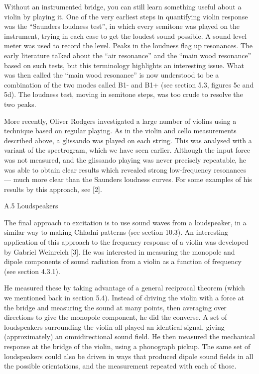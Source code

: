   Without an instrumented bridge, you can still learn something useful about a 
  violin by playing it. One of the very earliest steps in quantifying violin 
  response was the “Saunders loudness test”, in which every semitone was played 
  on the instrument, trying in each case to get the loudest sound possible. A 
  sound level meter was used to record the level. Peaks in the loudness flag up 
  resonances. The early literature talked about the “air resonance” and the 
  “main wood resonance” based on such tests, but this terminology highlights an 
  interesting issue. What was then called the “main wood resonance” is now 
  understood to be a combination of the two modes called B1- and B1+ (see 
  section 5.3, figures 5c and 5d). The loudness test, moving in semitone steps, 
  was too crude to resolve the two peaks. 

  More recently, Oliver Rodgers investigated a large number of violins using a 
  technique based on regular playing. As in the violin and cello measurements 
  described above, a glissando was played on each string. This was analysed 
  with a variant of the spectrogram, which we have seen earlier. Although the 
  input force was not measured, and the glissando playing was never precisely 
  repeatable, he was able to obtain clear results which revealed strong 
  low-frequency resonances — much more clear than the Saunders loudness curves. 
  For some examples of his results by this approach, see [2]. 

  A.5 Loudspeakers 

  The final approach to excitation is to use sound waves from a loudspeaker, in 
  a similar way to making Chladni patterns (see section 10.3). An interesting 
  application of this approach to the frequency response of a violin was 
  developed by Gabriel Weinreich [3]. He was interested in measuring the 
  monopole and dipole components of sound radiation from a violin as a function 
  of frequency (see section 4.3.1). 

  He measured these by taking advantage of a general reciprocal theorem (which 
  we mentioned back in section 5.4). Instead of driving the violin with a force 
  at the bridge and measuring the sound at many points, then averaging over 
  directions to give the monopole component, he did the converse. A set of 
  loudspeakers surrounding the violin all played an identical signal, giving 
  (approximately) an omnidirectional sound field. He then measured the 
  mechanical response at the bridge of the violin, using a phonograph pickup. 
  The same set of loudspeakers could also be driven in ways that produced 
  dipole sound fields in all the possible orientations, and the measurement 
  repeated with each of those. 

